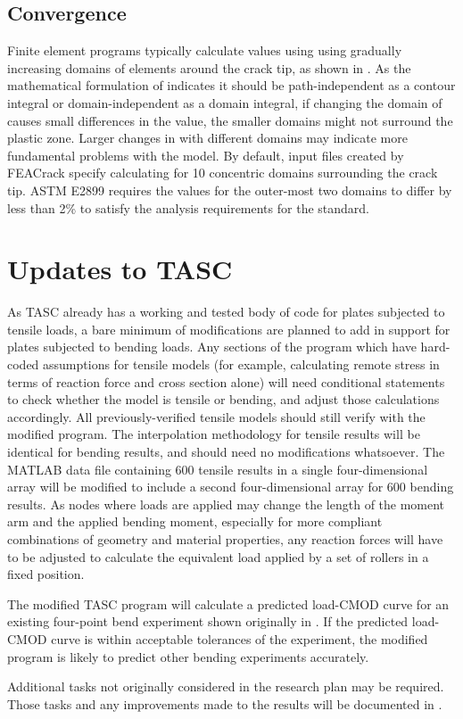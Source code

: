 \subsection{\J Convergence}

Finite element programs typically calculate \J values using using gradually increasing domains of elements around the crack tip, as shown in .
As the mathematical formulation of \J indicates it should be path-independent as a contour integral or domain-independent as a domain integral, if changing the domain of \J causes small differences in the \J value, the smaller domains might not surround the plastic zone. Larger changes in \J with different domains may indicate more fundamental problems with the model.
By default, input files created by FEACrack specify calculating \J for 10 concentric domains surrounding the crack tip.
ASTM E2899 requires the \J values for the outer-most two domains to differ by less than 2\% to satisfy the analysis requirements for the standard.

\section{Updates to TASC}

As TASC already has a working and tested body of code for plates subjected to tensile loads, a bare minimum of modifications are planned to add in support for plates subjected to bending loads.
Any sections of the program which have hard-coded assumptions for tensile models (for example, calculating remote stress in terms of reaction force and cross section alone) will need conditional statements to check whether the model is tensile or bending, and adjust those calculations accordingly.
All previously-verified tensile models should still verify with the modified program.
The interpolation methodology for tensile results will be identical for bending results, and should need no modifications whatsoever.
The MATLAB data file containing 600 tensile results in a single four-dimensional array will be modified to include a second four-dimensional array for 600 bending results.
As nodes where loads are applied may change the length of the moment arm and the applied bending moment, especially for more compliant combinations of geometry and material properties, any reaction forces will have to be adjusted to calculate the equivalent load applied by a set of rollers in a fixed position.

The modified TASC program will calculate a predicted load-CMOD curve for an existing four-point bend experiment shown originally in .
If the predicted load-CMOD curve is within acceptable tolerances of the experiment, the modified program is likely to predict other bending experiments accurately.




Additional tasks not originally considered in the research plan may be required.
Those tasks and any improvements made to the results will be documented in .